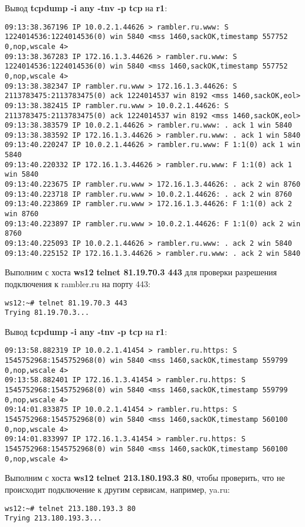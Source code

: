 \documentclass[a4paper,12pt]{article}
\begin{document}
Вывод \textbf{tcpdump -i any -tnv -p tcp} на \textbf{r1}:
\begin{Verbatim}
09:13:38.367196 IP 10.0.2.1.44626 > rambler.ru.www: S 1224014536:1224014536(0) win 5840 <mss 1460,sackOK,timestamp 557752 0,nop,wscale 4>
09:13:38.367283 IP 172.16.1.3.44626 > rambler.ru.www: S 1224014536:1224014536(0) win 5840 <mss 1460,sackOK,timestamp 557752 0,nop,wscale 4>
09:13:38.382347 IP rambler.ru.www > 172.16.1.3.44626: S 2113783475:2113783475(0) ack 1224014537 win 8192 <mss 1460,sackOK,eol>
09:13:38.382415 IP rambler.ru.www > 10.0.2.1.44626: S 2113783475:2113783475(0) ack 1224014537 win 8192 <mss 1460,sackOK,eol>
09:13:38.383579 IP 10.0.2.1.44626 > rambler.ru.www: . ack 1 win 5840
09:13:38.383592 IP 172.16.1.3.44626 > rambler.ru.www: . ack 1 win 5840
09:13:40.220247 IP 10.0.2.1.44626 > rambler.ru.www: F 1:1(0) ack 1 win 5840
09:13:40.220332 IP 172.16.1.3.44626 > rambler.ru.www: F 1:1(0) ack 1 win 5840
09:13:40.223675 IP rambler.ru.www > 172.16.1.3.44626: . ack 2 win 8760
09:13:40.223718 IP rambler.ru.www > 10.0.2.1.44626: . ack 2 win 8760
09:13:40.223869 IP rambler.ru.www > 172.16.1.3.44626: F 1:1(0) ack 2 win 8760
09:13:40.223897 IP rambler.ru.www > 10.0.2.1.44626: F 1:1(0) ack 2 win 8760
09:13:40.225093 IP 10.0.2.1.44626 > rambler.ru.www: . ack 2 win 5840
09:13:40.225152 IP 172.16.1.3.44626 > rambler.ru.www: . ack 2 win 5840
\end{Verbatim}

Выполним с хоста \textbf{ws12} \textbf{telnet 81.19.70.3 443} для проверки разрешения
подключения к rambler.ru на порту 443:
\begin{Verbatim}
ws12:~# telnet 81.19.70.3 443
Trying 81.19.70.3...
\end{Verbatim}

Вывод \textbf{tcpdump -i any -tnv -p tcp} на \textbf{r1}:
\begin{Verbatim}
09:13:58.882319 IP 10.0.2.1.41454 > rambler.ru.https: S 1545752968:1545752968(0) win 5840 <mss 1460,sackOK,timestamp 559799 0,nop,wscale 4>
09:13:58.882401 IP 172.16.1.3.41454 > rambler.ru.https: S 1545752968:1545752968(0) win 5840 <mss 1460,sackOK,timestamp 559799 0,nop,wscale 4>
09:14:01.833875 IP 10.0.2.1.41454 > rambler.ru.https: S 1545752968:1545752968(0) win 5840 <mss 1460,sackOK,timestamp 560100 0,nop,wscale 4>
09:14:01.833997 IP 172.16.1.3.41454 > rambler.ru.https: S 1545752968:1545752968(0) win 5840 <mss 1460,sackOK,timestamp 560100 0,nop,wscale 4>
\end{Verbatim}

Выполним с хоста \textbf{ws12} \textbf{telnet 213.180.193.3 80},  чтобы проверить, что
не происходит подключение к другим сервисам, например, ya.ru:
\begin{Verbatim}
ws12:~# telnet 213.180.193.3 80
Trying 213.180.193.3...
\end{Verbatim}
\end{document}
